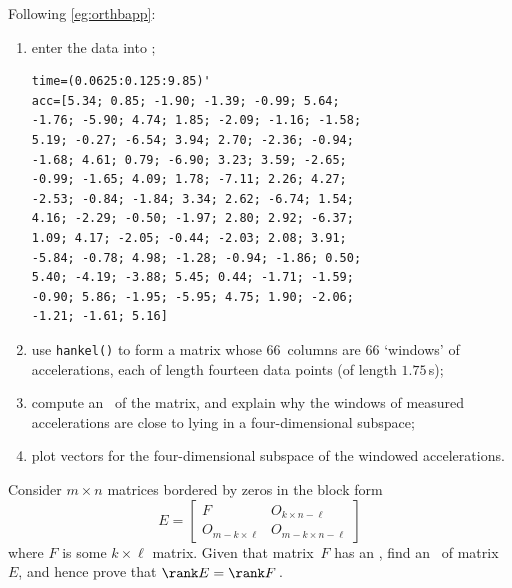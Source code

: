 \begin{exercise}
Following \cref{eg:orthbapp}:
\begin{enumerate}
\item enter the data into \script;
\setbox\ajrqrbox\hbox{}%
\marginajrbox%
\begin{verbatim}
time=(0.0625:0.125:9.85)'
acc=[5.34; 0.85; -1.90; -1.39; -0.99; 5.64;
-1.76; -5.90; 4.74; 1.85; -2.09; -1.16; -1.58;
5.19; -0.27; -6.54; 3.94; 2.70; -2.36; -0.94;
-1.68; 4.61; 0.79; -6.90; 3.23; 3.59; -2.65;
-0.99; -1.65; 4.09; 1.78; -7.11; 2.26; 4.27;
-2.53; -0.84; -1.84; 3.34; 2.62; -6.74; 1.54;
4.16; -2.29; -0.50; -1.97; 2.80; 2.92; -6.37;
1.09; 4.17; -2.05; -0.44; -2.03; 2.08; 3.91;
-5.84; -0.78; 4.98; -1.28; -0.94; -1.86; 0.50;
5.40; -4.19; -3.88; 5.45; 0.44; -1.71; -1.59;
-0.90; 5.86; -1.95; -5.95; 4.75; 1.90; -2.06;
-1.21; -1.61; 5.16]
\end{verbatim}
\item use \verb|hankel()|  to form a matrix whose 66~columns are 66 `windows' of accelerations, each of length fourteen data points (of length \(1.75\)\,s);

\item compute an \svd\ of the matrix, and explain why the windows of measured accelerations are close to lying in a four-dimensional subspace;

\item plot  vectors for the four-dimensional subspace of the windowed accelerations.
\end{enumerate}
\end{exercise}







\begin{exercise} \label{ex:rankobord} 
Consider \(m\times n\) matrices bordered by zeros in the block form
\begin{equation*}
E=\begin{bmatrix} F&O_{k\times n-\ell}
\\O_{m-k\times \ell}& O_{m-k\times n-\ell} \end{bmatrix}
\end{equation*}
where \(F\) is some \(k\times\ell\) matrix.
Given that matrix~\(F\) has an \svd, find an \svd\ of matrix~\(E\), and hence prove that \(\rank E=\rank F\)\,.
\end{exercise}

